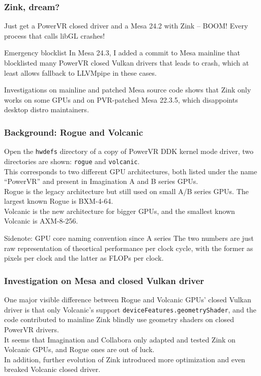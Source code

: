 \documentclass{beamer}
\begin{document}
\begin{frame}
	\frametitle{Zink, dream?}
	Just get a PowerVR closed driver and a Mesa 24.2 with Zink -- BOOM! Every process that calls libGL crashes!
	\begin{block}{Emergency blocklist}
		In Mesa 24.3, I added a commit to Mesa mainline that blocklisted many PowerVR closed Vulkan drivers that leads to crash, which at least allows fallback to LLVMpipe in these cases.
	\end{block}
	Investigations on mainline and patched Mesa source code shows that Zink only works on some GPUs and on PVR-patched Mesa 22.3.5, which disappoints desktop distro maintainers.
\end{frame}

\begin{frame}
	\frametitle{Background: Rogue and Volcanic}
	Open the \texttt{hwdefs} directory of a copy of PowerVR DDK kernel mode driver, two directories are shown: \texttt{rogue} and \texttt{volcanic}. \\
	This corresponds to two different GPU architectures, both listed under the name ``PowerVR'' and present in Imagination A and B series GPUs. \\
	Rogue is the legacy architecture but still used on small A/B series GPUs. The largest known Rogue is BXM-4-64. \\
	Volcanic is the new architecture for bigger GPUs, and the smallest known Volcanic is AXM-8-256.
	\begin{block}{Sidenote: GPU core naming convention since A series}
		The two numbers are just raw representation of theortical performance per clock cycle, with the former as pixels per clock and the latter as FLOPs per clock.
	\end{block}
\end{frame}

\begin{frame}
	\frametitle{Investigation on Mesa and closed Vulkan driver}
	One major visible difference between Rogue and Volcanic GPUs' closed Vulkan driver is that only Volcanic's support \texttt{deviceFeatures.geometryShader}, and the code contributed to mainline Zink blindly use geometry shaders on closed PowerVR drivers. \\
	\vfill
 	It seems that Imagination and Collabora only adapted and tested Zink on Volcanic GPUs, and Rogue ones are out of luck. \\
 	In addition, further evolution of Zink introduced more optimization and even breaked Volcanic closed driver.
\end{frame}
\end{document}
